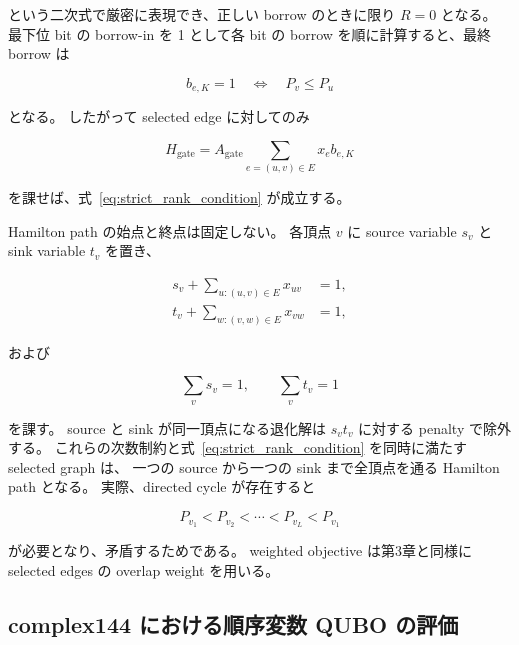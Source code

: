 という二次式で厳密に表現でき、正しい borrow のときに限り $R=0$ となる。
最下位 bit の borrow-in を 1 として各 bit の borrow を順に計算すると、最終 borrow は

\begin{equation}
b_{e,K}=1
\quad\Longleftrightarrow\quad
P_v\leq P_u
\label{eq:final_borrow_order}
\end{equation}

となる。
したがって selected edge に対してのみ

\begin{equation}
H_{\mathrm{gate}}
=
A_{\mathrm{gate}}
\sum_{e=(u,v)\in E}
 x_e b_{e,K}
\label{eq:strict_rank_gate}
\end{equation}

を課せば、式~\eqref{eq:strict_rank_condition} が成立する。

Hamilton path の始点と終点は固定しない。
各頂点 $v$ に source variable $s_v$ と sink variable $t_v$ を置き、

\begin{align}
s_v+\sum_{u:(u,v)\in E}x_{uv}&=1,\\
t_v+\sum_{w:(v,w)\in E}x_{vw}&=1,
\label{eq:strict_rank_path_degree}
\end{align}

および

\begin{equation}
\sum_v s_v=1,
\qquad
\sum_v t_v=1
\label{eq:strict_rank_endpoint_count}
\end{equation}

を課す。
source と sink が同一頂点になる退化解は $s_vt_v$ に対する penalty で除外する。
これらの次数制約と式~\eqref{eq:strict_rank_condition} を同時に満たす selected graph は、
一つの source から一つの sink まで全頂点を通る Hamilton path となる。
実際、directed cycle が存在すると

\begin{equation}
P_{v_1}<P_{v_2}<\cdots<P_{v_L}<P_{v_1}
\end{equation}

が必要となり、矛盾するためである。
weighted objective は第3章と同様に selected edges の overlap weight を用いる。

\subsection{complex144 における順序変数 QUBO の評価}

